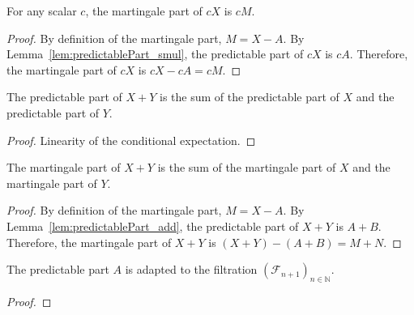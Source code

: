 \begin{lemma}\label{lem:martingalePart_smul}
  \leanok
For any scalar $c$, the martingale part of $c X$ is $c M$.
\end{lemma}

\begin{proof}\leanok
By definition of the martingale part, $M = X - A$. By Lemma~\ref{lem:predictablePart_smul}, the predictable part of $c X$ is $c A$. Therefore, the martingale part of $c X$ is $c X - c A = c M$.
\end{proof}


\begin{lemma}\label{lem:predictablePart_add}
  \leanok
The predictable part of $X + Y$ is the sum of the predictable part of $X$ and the predictable part of $Y$.
\end{lemma}

\begin{proof}\leanok
Linearity of the conditional expectation.
\end{proof}


\begin{lemma}\label{lem:martingalePart_add}
  \leanok
The martingale part of $X + Y$ is the sum of the martingale part of $X$ and the martingale part of $Y$.
\end{lemma}

\begin{proof}\leanok
By definition of the martingale part, $M = X - A$. By Lemma~\ref{lem:predictablePart_add}, the predictable part of $X + Y$ is $A + B$. Therefore, the martingale part of $X + Y$ is $(X + Y) - (A + B) = M + N$.
\end{proof}


\begin{lemma}\label{lem:adapted_predictablePart}
  \mathlibok
The predictable part $A$ is adapted to the filtration $(\mathcal{F}_{n+1})_{n \in \mathbb{N}}$.
\end{lemma}

\begin{proof}\mathlibok

\end{proof}


